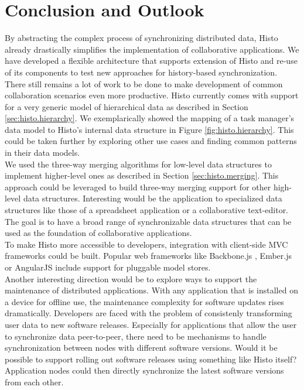 \chapter{Conclusion and Outlook}
By abstracting the complex process of synchronizing distributed data, Histo already drastically simplifies the implementation of collaborative applications.
We have developed a flexible architecture that supports extension of Histo and re-use of its components to test new approaches for history-based synchronization.\\
There still remains a lot of work to be done to make development of common collaboration scenarios even more productive.
Histo currently comes with support for a very generic model of hierarchical data as described in Section \ref{sec:histo.hierarchy}.
We exemplarically showed the mapping of a task manager's data model to Histo's internal data structure in Figure \ref{fig:histo.hierarchy}.
This could be taken further by exploring other use cases and finding common patterns in their data models.\\
We used the three-way merging algorithms for low-level data structures to implement higher-level ones as described in Section \ref{sec:histo.merging}.
This approach could be leveraged to build three-way merging support for other high-level data structures.
Interesting would be the application to specialized data structures like those of a spreadsheet application or a collaborative text-editor.\\
The goal is to have a broad range of synchronizable data structures that can be used as the foundation of collaborative applications.\\
To make Histo more accessible to developers, integration with client-side MVC frameworks could be built.
Popular web frameworks like Backbone.js \cite{backbone}, Ember.js \cite{ember} or AngularJS \cite{angular} include support for pluggable model stores.\\
Another interesting direction would be to explore ways to support the maintenance of distributed applications.
With any application that is installed on a device for offline use, the maintenance complexity for software updates rises dramatically.
Developers are faced with the problem of consistenly transforming user data to new software releases.
Especially for applications that allow the user to synchronize data peer-to-peer, there need to be mechanisms to handle synchronization between nodes with different software versions.
Would it be possible to support rolling out software releases using something like Histo itself?
Application nodes could then directly synchronize the latest software versions from each other.
